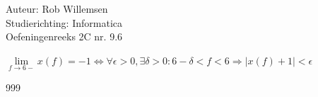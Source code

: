 \documentclass[a4paper]{article}
\begin{document}
\noindent \large Auteur: Rob Willemsen \\
\noindent \large Studierichting: Informatica\\
\noindent \large Oefeningenreeks 2C nr. 9.6\\

\medskip

\normalsize

$\lim\limits_{f \rightarrow 6-} x(f) = -1 \Leftrightarrow \forall \epsilon > 0, \exists \delta > 0 : 6 - \delta < f < 6 \Rightarrow |x(f) + 1| < \epsilon$ \\

\begin{thebibliography}{999}
\end{thebibliography}
\end{document}
